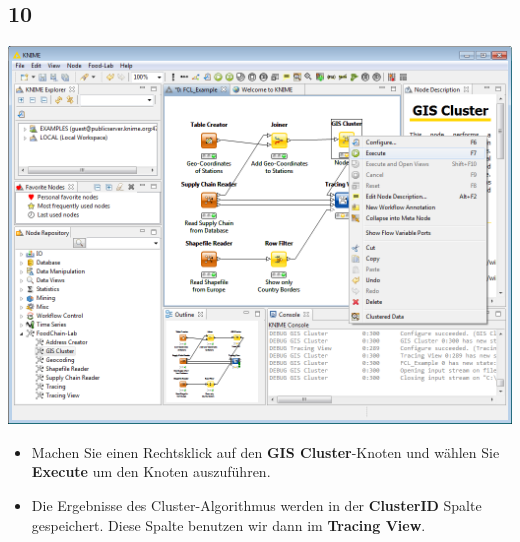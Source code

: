 \documentclass{beamer}
\begin{document}
\subsection{10}
\begin{frame}
	\begin{center}
  		\includegraphics[height=0.6\textheight]{10.png}
	\end{center}
	\begin{itemize}
		\item Machen Sie einen Rechtsklick auf den \textbf{GIS Cluster}-Knoten und wählen Sie \textbf{Execute} um den Knoten auszuführen.
		\item Die Ergebnisse des Cluster-Algorithmus werden in der \textbf{ClusterID} Spalte gespeichert. Diese Spalte benutzen wir dann im \textbf{Tracing View}.
	\end{itemize}
\end{frame}
\end{document}
